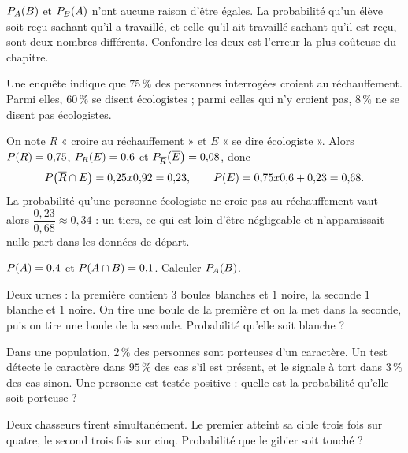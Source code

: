 \begin{avertissement}
$\probacond{B}{A}$ et $\probacond{A}{B}$ n'ont aucune raison d'être égales.
La probabilité qu'un élève soit reçu sachant qu'il a travaillé, et celle qu'il
ait travaillé sachant qu'il est reçu, sont deux nombres différents. Confondre
les deux est l'erreur la plus coûteuse du chapitre.
\end{avertissement}

\begin{exemple}
Une enquête indique que $75\,\%$ des personnes interrogées croient au
réchauffement. Parmi elles, $60\,\%$ se disent écologistes ; parmi celles qui
n'y croient pas, $8\,\%$ ne se disent pas écologistes.

On note $R$ « croire au réchauffement » et $E$ « se dire écologiste ». Alors
$\proba{R} = 0{,}75$, $\probacond{E}{R} = 0{,}6$ et
$\probacond{\evtc{E}}{\evtc{R}} = 0{,}08$, donc
\[
  \proba{\evtc{R} \cap E} = 0{,}25 \times 0{,}92 = 0{,}23,
  \qquad
  \proba{E} = 0{,}75 \times 0{,}6+0{,}23 = 0{,}68 .
\]
La probabilité qu'une personne écologiste ne croie pas au réchauffement vaut
alors $\dfrac{0{,}23}{0{,}68} \approx 0{,}34$ : un tiers, ce qui est loin
d'être négligeable et n'apparaissait nulle part dans les données de départ.
\end{exemple}

\begin{entrainement}[conditionnement]
\exo[\niveau{1}] $\proba{A} = 0{,}4$ et $\proba{A \cap B} = 0{,}1$.
Calculer $\probacond{B}{A}$.

\exo[\niveau{2}] Deux urnes : la première contient $3$ boules blanches et $1$
noire, la seconde $1$ blanche et $1$ noire. On tire une boule de la première
et on la met dans la seconde, puis on tire une boule de la seconde.
Probabilité qu'elle soit blanche ?

\exo[\niveau{2}] Dans une population, $2\,\%$ des personnes sont porteuses
d'un caractère. Un test détecte le caractère dans $95\,\%$ des cas s'il est
présent, et le signale à tort dans $3\,\%$ des cas sinon. Une personne est
testée positive : quelle est la probabilité qu'elle soit porteuse ?

\exo[\niveau{3}] Deux chasseurs tirent simultanément. Le premier atteint sa
cible trois fois sur quatre, le second trois fois sur cinq. Probabilité que le
gibier soit touché ?
\end{entrainement}

